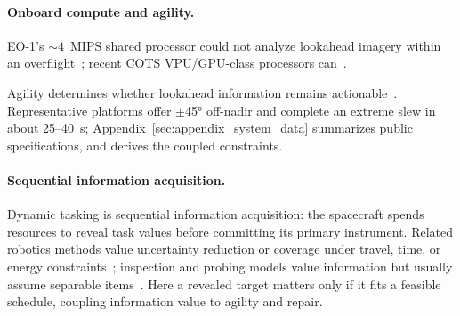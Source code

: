 \paragraph{Onboard compute and agility.}
\label{sec:compute}
\label{sec:agility_background}
EO-1's ${\sim}4$~MIPS shared processor could not analyze lookahead imagery within an overflight~\citep{chien_using_2005, chien_lessons_2005}; recent COTS VPU/GPU-class processors can~\citep{kacker_machine_2022, giuffrida_-sat-1_2022, marin_phi-sat-2_2021, rijlaarsdam_autonomous_2024, rijlaarsdam_next_2024, noauthor_planet_2024}.

Agility determines whether lookahead information remains actionable~\citep{eddy_task_2021, lemaitre_selecting_2002}. Representative platforms offer $\pm$\ang{45} off-nadir and complete an extreme slew in about 25--40~s; Appendix~\ref{sec:appendix_system_data} summarizes public specifications, and  derives the coupled constraints.

\paragraph{Sequential information acquisition.}
Dynamic tasking is sequential information acquisition: the spacecraft spends resources to reveal task values before committing its primary instrument. Related robotics methods value uncertainty reduction or coverage under travel, time, or energy constraints~\citep{singh_nonmyopic_2009, tan_informative_2024}; inspection and probing models value information but usually assume separable items~\citep{weitzman_optimal_1978, gupta_algorithms_2015}. Here a revealed target matters only if it fits a feasible schedule, coupling information value to agility and repair.
